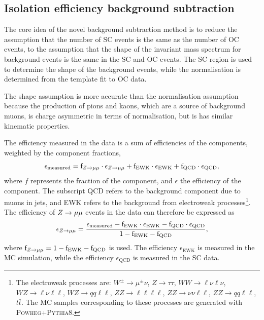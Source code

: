 \subsection{Isolation efficiency background subtraction}
\label{sec:muon:bkg_sub}

The core idea of the novel background subtraction method is to
reduce the assumption that the number of SC events is the same as
the number of OC events, to the assumption that the shape of the
invariant mass spectrum for background events is the same in the
SC and OC events. The SC region is used to determine the shape
of the background events, while the normalisation is determined
from the template fit to OC data.

The shape assumption is more accurate than the normalisation assumption
because the production of pions and kaons, which are a source of
background muons, is charge asymmetric in terms of normalisation,
but is has similar kinematic properties.

The efficiency measured in the data is a sum of efficiencies of the
components, weighted by the component fractions,
\begin{equation}
\epsilon_\text{measured} =
\text{f}_{Z \rightarrow \mu\mu}   \cdot \epsilon_{Z \rightarrow \mu\mu} +
\text{f}_\text{EWK} \cdot \epsilon_\text{EWK} + 
\text{f}_\text{QCD} \cdot \epsilon_\text{QCD},
\end{equation}
where $f$ represents the fraction of the component, and $\epsilon$
the efficiency of the component. The subscript QCD refers to the
background component due to muons in jets, and EWK refers to the
background from electroweak processes\footnote{The electroweak processes are:
$W^\pm\rightarrow\mu^\pm \nu$, $Z\rightarrow \tau\tau$,
$WW\rightarrow \ell \nu \ell \nu$, $WZ\rightarrow \ell \nu \ell \ell$,
$WZ\rightarrow qq \ell \ell$, $ZZ\rightarrow\ell\ell\ell\ell$,
$ZZ\rightarrow\nu\nu\ell\ell$, $ZZ\rightarrow qq\ell\ell$,
$t\bar t$. The MC samples corresponding to these processes are generated
with \textsc{Powheg}+\textsc{Pythia}8.}.
The efficiency of $Z \rightarrow \mu\mu$ events in the data can therefore be expressed as
\begin{equation}
\epsilon_{Z \rightarrow \mu\mu} = \frac
{\epsilon_\text{measured} - \text{f}_\text{EWK} \cdot \epsilon_\text{EWK} - \text{f}_\text{QCD} \cdot \epsilon_\text{QCD}}
{1 - \text{f}_\text{EWK} - \text{f}_\text{QCD}},
\end{equation}
where $\text{f}_{Z \rightarrow \mu\mu} = 1 - \text{f}_\text{EWK} - \text{f}_\text{QCD}$
is used. The efficiency $\epsilon_\text{EWK}$ is measured in the MC simulation,
while the efficiency $\epsilon_\text{QCD}$ is measured in the SC data.

